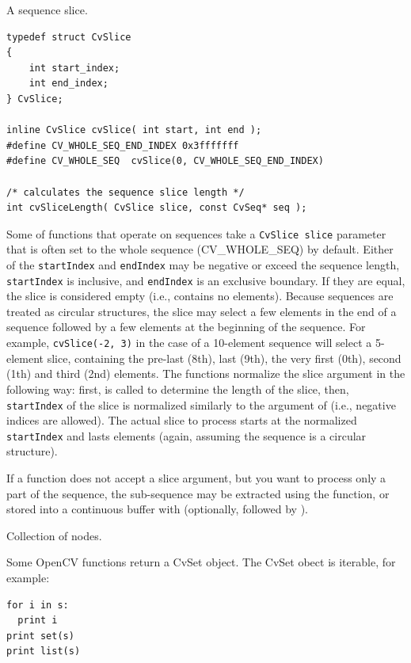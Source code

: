 \label{CvSlice}
A sequence slice.

\begin{lstlisting}
typedef struct CvSlice
{
    int start_index;
    int end_index;
} CvSlice;

inline CvSlice cvSlice( int start, int end );
#define CV_WHOLE_SEQ_END_INDEX 0x3fffffff
#define CV_WHOLE_SEQ  cvSlice(0, CV_WHOLE_SEQ_END_INDEX)

/* calculates the sequence slice length */
int cvSliceLength( CvSlice slice, const CvSeq* seq );
\end{lstlisting}

Some of functions that operate on sequences take a \texttt{CvSlice slice}
parameter that is often set to the whole sequence (CV\_WHOLE\_SEQ) by
default. Either of the \texttt{startIndex} and \texttt{endIndex}
may be negative or exceed the sequence length, \texttt{startIndex} is
inclusive, and \texttt{endIndex} is an exclusive boundary. If they are equal,
the slice is considered empty (i.e., contains no elements). Because
sequences are treated as circular structures, the slice may select a
few elements in the end of a sequence followed by a few elements at the
beginning of the sequence. For example, \texttt{cvSlice(-2, 3)} in the case of
a 10-element sequence will select a 5-element slice, containing the pre-last
(8th), last (9th), the very first (0th), second (1th) and third (2nd)
elements. The functions normalize the slice argument in the following way:
first,  is called to determine the length of the slice,
then, \texttt{startIndex} of the slice is normalized similarly to the
argument of  (i.e., negative indices are allowed). The
actual slice to process starts at the normalized \texttt{startIndex}
and lasts  elements (again, assuming the sequence is
a circular structure).

If a function does not accept a slice argument, but you want to process
only a part of the sequence, the sub-sequence may be extracted
using the  function, or stored into a continuous
buffer with  (optionally, followed by
).

\fi

\label{CvSet}
Collection of nodes.

\ifPy
Some OpenCV functions return a CvSet object. The CvSet obect is iterable, for example:

\begin{lstlisting}
for i in s:
  print i
print set(s)
print list(s)
\end{lstlisting}

